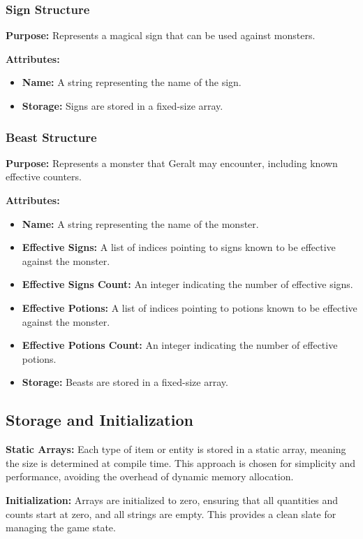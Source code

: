 \documentclass{article}
\begin{document}
\subsubsection*{Sign Structure}
\textbf{Purpose:} Represents a magical sign that can be used against monsters.

\textbf{Attributes:}
\begin{itemize}
    \item \textbf{Name:} A string representing the name of the sign.
    \item \textbf{Storage:} Signs are stored in a fixed-size array.
\end{itemize}

\subsubsection*{Beast Structure}
\textbf{Purpose:} Represents a monster that Geralt may encounter, including known effective counters.

\textbf{Attributes:}
\begin{itemize}
    \item \textbf{Name:} A string representing the name of the monster.
    \item \textbf{Effective Signs:} A list of indices pointing to signs known to be effective against the monster.
    \item \textbf{Effective Signs Count:} An integer indicating the number of effective signs.
    \item \textbf{Effective Potions:} A list of indices pointing to potions known to be effective against the monster.
    \item \textbf{Effective Potions Count:} An integer indicating the number of effective potions.
    \item \textbf{Storage:} Beasts are stored in a fixed-size array.
\end{itemize}

\subsection*{Storage and Initialization}

\textbf{Static Arrays:} Each type of item or entity is stored in a static array, meaning the size is determined at compile time. This approach is chosen for simplicity and performance, avoiding the overhead of dynamic memory allocation.

\textbf{Initialization:} Arrays are initialized to zero, ensuring that all quantities and counts start at zero, and all strings are empty. This provides a clean slate for managing the game state.
\end{document}
